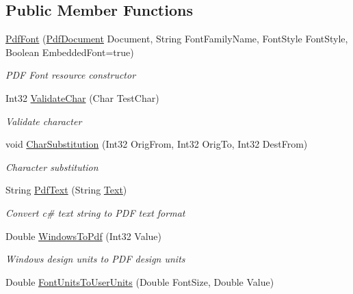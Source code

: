 \subsection*{Public Member Functions}
\begin{DoxyCompactItemize}
\item 
\hyperlink{class_pdf_file_writer_1_1_pdf_font_abaf01b845fdc439dec69a80d94a56bc6}{Pdf\+Font} (\hyperlink{class_pdf_file_writer_1_1_pdf_document}{Pdf\+Document} Document, String Font\+Family\+Name, Font\+Style Font\+Style, Boolean Embedded\+Font=true)
\begin{DoxyCompactList}\small\item\em P\+DF Font resource constructor \end{DoxyCompactList}\item 
Int32 \hyperlink{class_pdf_file_writer_1_1_pdf_font_aa5d8c2b2adee381839897a6391dc3737}{Validate\+Char} (Char Test\+Char)
\begin{DoxyCompactList}\small\item\em Validate character \end{DoxyCompactList}\item 
void \hyperlink{class_pdf_file_writer_1_1_pdf_font_af29b41e62ee88ef675b3d6119e5204f0}{Char\+Substitution} (Int32 Orig\+From, Int32 Orig\+To, Int32 Dest\+From)
\begin{DoxyCompactList}\small\item\em Character substitution \end{DoxyCompactList}\item 
String \hyperlink{class_pdf_file_writer_1_1_pdf_font_a8d361f8ef8c9e7edc2b6dcfba7979863}{Pdf\+Text} (String \hyperlink{namespace_pdf_file_writer_a45e52c090a4d8e1333577773ec0bac4aa9dffbf69ffba8bc38bc4e01abf4b1675}{Text})
\begin{DoxyCompactList}\small\item\em Convert c\# text string to P\+DF text format \end{DoxyCompactList}\item 
Double \hyperlink{class_pdf_file_writer_1_1_pdf_font_ad6ea5d3aeefb46b14c154e8f8eeb3cde}{Windows\+To\+Pdf} (Int32 Value)
\begin{DoxyCompactList}\small\item\em Windows design units to P\+DF design units \end{DoxyCompactList}\item 
Double \hyperlink{class_pdf_file_writer_1_1_pdf_font_a1da9b448c4e51b4b0965cfd7dae6536f}{Font\+Units\+To\+User\+Units} (Double Font\+Size, Double Value)

\end{DoxyCompactItemize}

